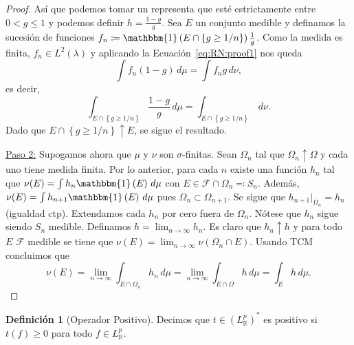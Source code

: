 \documentclass{article}
\theoremstyle{plain}
\theoremstyle{definition}
\newtheorem{Definicion}{Definición}
\newcommand{\1}[1]{\mathbbm{1}\left( #1 \right)}
\newcommand{\R}{\mathbb{R}}
\begin{document}
\begin{proof}
  Así que podemos tomar un representa que esté estrictamente entre \(0 < g \le 1\) y 
  podemos definir \(h = \frac{1-g}{g}\). Sea \(E\) un conjunto medible y definamos la sucesión
  de funciones \(f_n \coloneqq \1{E\cap\left\{ g\ge 1/n \right\}} \frac{1}{g}\). Como la medida
  es finita, \(f_n\in L^2(\lambda)\) y aplicando la Ecuación~\eqref{eq:RN:proof1} nos queda
  \begin{displaymath}
    \int f_n (1-g) \, d\mu = \int f_n g \, d\nu,
  \end{displaymath}
  es decir,
  \begin{displaymath}
    \int_{E\cap \left\{ g \ge 1/n \right\}} \frac{1-g}{g} \, d\mu
    =
    \int_{E\cap \left\{ g \ge 1/n \right\}} \, d\nu.
  \end{displaymath}
  Dado que \(E\cap \left\{ g\ge 1/n \right\} \uparrow E\), se sigue el resultado.
  
  \underline{Paso 2:} Supogamos ahora que \(\mu\) y \(\nu\) son \(\sigma\)-finitas. Sean 
  \(\Omega_n\) tal que \(\Omega_n \uparrow \Omega\) y cada uno tiene medida finita.
  Por lo anterior, para cada \(n\) existe una función \(h_n\) tal que
  \(\nu(E) = \int h_n \1{E} \, d\mu\) con \(E \in \mathcal{F}\cap \Omega_n \eqqcolon S_n\). 
  Además, \(\nu(E) = \int h_{n+1} \1{E} \, d\mu\) pues \(\Omega_n \subset \Omega_{n+1}\). Se sigue
  que \(h_{n+1}\vert_{\Omega_n} = h_n\) (igualdad ctp). Extendamos cada \(h_n\) por cero fuera
  de \(\Omega_n\). Nótese que \(h_n\) sigue siendo \(S_n\) medible. Definamos
  \(h = \lim_{n\to \infty} h_n\). Es claro que \(h_n \uparrow h\) y para todo \(E\) \(\mathcal{F}\)    
  medible se tiene que \(\nu(E) = \lim_{n\to\infty} \nu(\Omega_n\cap E)\). Usando TCM concluimos que
  \begin{displaymath}
    \nu(E) 
    = \lim_{n\to\infty} \int_{E\cap\Omega_n} h_n \, d\mu
    = \lim_{n\to\infty} \int_{E\cap\Omega} h \, d\mu
    = \int_{E} h \, d\mu.
  \end{displaymath}
\end{proof}

\begin{Definicion}[Operador Positivo]
  Decimos que \(t \in (L^p_{\R})^{\ast}\) es positivo si \(t(f) \ge 0\) para todo \(f\in L^{p}_{\R}\).  
\end{Definicion}
\end{document}

